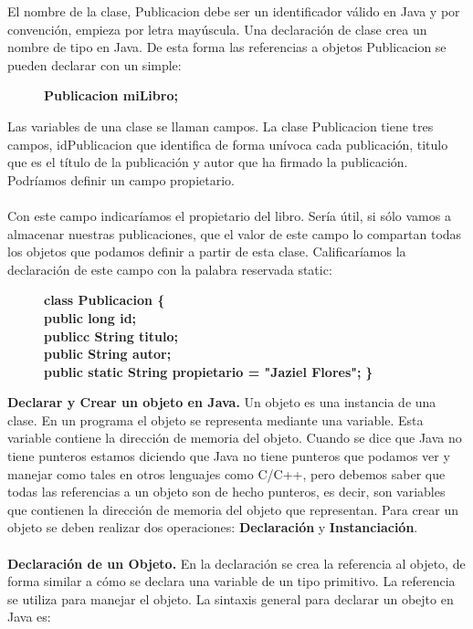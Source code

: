 \documentclass[a4paper]{article}
\begin{document}
El nombre de la clase, Publicacion debe ser un identificador válido en Java y por convención, empieza por letra mayúscula. Una declaración de clase crea un nombre de tipo en Java. De esta forma las referencias a objetos Publicacion se pueden declarar con un simple:
\begin{figure}[H]
\centering
	\textbf{Publicacion miLibro;}\\
\end{figure}
Las variables de una clase se llaman campos. La clase Publicacion tiene tres campos, idPublicacion que identifica de forma unívoca cada publicación, titulo que es el título de la publicación y autor que ha firmado la publicación. Podríamos definir un campo propietario.\\
\\ 
Con este campo indicaríamos el propietario del libro. Sería útil, si sólo vamos a almacenar nuestras publicaciones, que el valor de este campo lo compartan todas los objetos que podamos definir a partir de esta clase. Calificaríamos la declaración de este campo con la palabra reservada static:
\begin{figure}[H]
	\centering
	\textbf{class Publicacion \{}\\
	\textbf{public long id;}\\
	\textbf{publicc String titulo;}\\
	\textbf{public String autor;}\\
	\textbf{public static String propietario = "Jaziel Flores";}
	\textbf{\}}
\end{figure}

\textbf{Declarar y Crear un objeto en Java.}
Un objeto es una instancia de una clase. En un programa el objeto se representa mediante una variable. Esta variable contiene la dirección de memoria del objeto. Cuando se dice que Java no tiene punteros estamos diciendo que Java no tiene punteros que podamos ver y manejar como tales en otros lenguajes como C/C++, pero debemos saber que todas las referencias a un objeto son de hecho punteros, es decir, son variables que contienen la dirección de memoria del objeto que representan. Para crear un objeto se deben realizar dos operaciones: \textbf{Declaración} y \textbf{Instanciación}.\\ 
\\
\textbf{Declaración de un Objeto.}
En la declaración se crea la referencia al objeto, de forma similar a cómo se declara una variable de un tipo primitivo. La referencia se utiliza para manejar el objeto. La sintaxis general para declarar un obejto en Java es:
\end{document}
